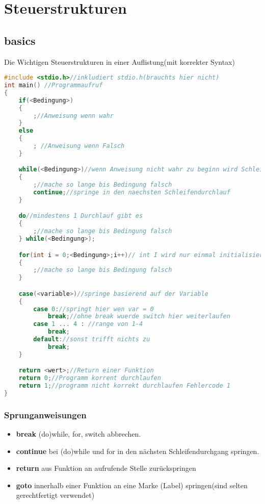 \newpage
\section{Steuerstrukturen}
\subsection{basics}
Die Wichtigen Steuerstrukturen in einer Auflistung(mit korrekter Syntax) 

\begin{lstlisting}[language = c]
#include <stdio.h>//inkludiert stdio.h(brauchts hier nicht)
int main() //Programmaufruf
{
    if(<Bedingung>)
    {
        ;//Anweisung wenn wahr
    }
    else
    {
        ; //Anweisung wenn Falsch
    }

    while(<Bedingung>)//wenn Anweisung nicht wahr zu beginn wird Schleife nicht betreten
    {
        ;//mache so lange bis Bedingung falsch
        continue;//springe in den naechsten Schleifendurchlauf
    }

    do//mindestens 1 Durchlauf gibt es
    {
        ;//mache so lange bis Bedingung falsch
    } while(<Bedingung>);

    for(int i = 0;<Bedingung>;i++)// int I wird nur einmal initialisiert und i wird immer nach dem schleifendurchgang initialisiert
    {
        ;//mache so lange bis Bedingung falsch
    }

    case(<variable>)//springe basierend auf der Variable
    {
        case 0://springt hier wen var = 0
            break;//ohne break wuerde switch hier weiterlaufen
        case 1 ... 4 : //range von 1-4
            break;
        default://sonst trifft nichts zu
            break;
    }

    return <wert>;//Return einer Funktion
    return 0;//Programm korrent durchlaufen
    return 1;//programm nicht korrekt durchlaufen Fehlercode 1    
}
\end{lstlisting}

\subsubsection{Sprunganweisungen}

\begin{itemize}[itemsep=1pt, parsep=0pt]
    \item \textbf{break} \newline (do)while, for, switch abbrechen.
    \item \textbf{continue} \newline bei (do)while und for in den nächsten Schleifendurchgang springen.
    \item \textbf{return} \newline aus Funktion an aufrufende Stelle zurückspringen
    \item \textbf{goto} \newline innerhalb einer Funktion an eine Marke (Label) springen(sind selten gerechtfertigt verwendet)
\end{itemize}

